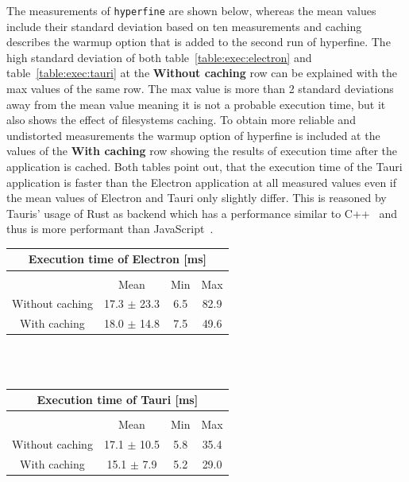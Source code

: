 The measurements of \texttt{hyperfine} are shown below, whereas the mean values include their standard deviation based on ten measurements and caching describes the warmup option that is added to the second run of hyperfine.
The high standard deviation of both table~\ref{table:exec:electron} and table~\ref{table:exec:tauri} at the \textbf{Without caching} row can be explained with the max values of the same row.
The max value is more than 2 standard deviations away from the mean value meaning it is not a probable execution time, but it also shows the effect of filesystems caching.
To obtain more reliable and undistorted measurements the warmup option of hyperfine is included at the values of the \textbf{With caching} row showing the results of execution time after the application is cached.
Both tables point out, that the execution time of the Tauri application is faster than the Electron application at all measured values even if the mean values of Electron and Tauri only slightly differ.
This is reasoned by Tauris' usage of Rust as backend which has a performance similar to C++~\cite{rustPerformance} and thus is more performant than JavaScript~\cite{C++Javascript}.

\begin{tabular} {| c | c | c | c |}
    \hline
    \multicolumn{4}{|c|}{Execution time of Electron [ms]} \\ \hline
     \multicolumn{4}{|c|}{}\\ \hline
     & Mean   & Min & Max     \\ \hline
    Without caching & 17.3 $\pm$ 23.3 & 6.5 & 82.9  \\ \hline
    With caching & 18.0 $\pm$ 14.8 & 7.5 & 49.6 \\ \hline
\end{tabular}
\label{table:exec:electron}
\\ \\

\begin{tabular} {| c | c | c | c |}
    \hline
    \multicolumn{4}{|c|}{Execution time of Tauri [ms]} \\ \hline
    \multicolumn{4}{|c|}{}\\ \hline
    & Mean & Min & Max     \\ \hline
    Without caching & 17.1 $\pm$ 10.5 & 5.8 & 35.4  \\ \hline
    With caching & 15.1 $\pm$ 7.9 & 5.2 & 29.0 \\ \hline
\end{tabular}
\label{table:exec:tauri}
\\ \\
